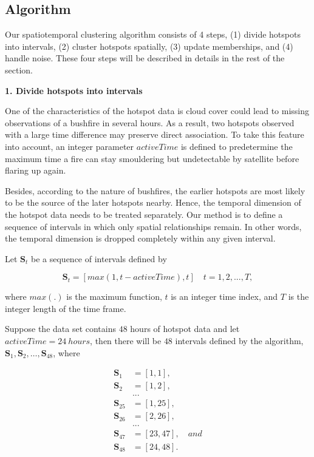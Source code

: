 \hypertarget{algorithm}{%
\subsection{Algorithm}\label{algorithm}}

Our spatiotemporal clustering algorithm consists of 4 steps, (1) divide
hotspots into intervals, (2) cluster hotspots spatially, (3) update
memberships, and (4) handle noise. These four steps will be described in
details in the rest of the section.

\textbf{1. Divide hotspots into intervals}

One of the characteristics of the hotspot data is cloud cover could lead
to missing observations of a bushfire in several hours. As a result, two
hotspots observed with a large time difference may preserve direct
association. To take this feature into account, an integer parameter
\(activeTime\) is defined to predetermine the maximum time a fire can
stay smouldering but undetectable by satellite before flaring up again.

Besides, according to the nature of bushfires, the earlier hotspots are
most likely to be the source of the later hotspots nearby. Hence, the
temporal dimension of the hotspot data needs to be treated separately.
Our method is to define a sequence of intervals in which only spatial
relationships remain. In other words, the temporal dimension is dropped
completely within any given interval.

Let \(\boldsymbol{S}_t\) be a sequence of intervals defined by

\[\boldsymbol{S}_t = [max(1,t-activeTime),t]\quad t = 1,2,...,T,\]

where \(max(.)\) is the maximum function, \(t\) is an integer time
index, and \(T\) is the integer length of the time frame.

Suppose the data set contains \(48\) hours of hotspot data and let
\(activeTime = 24~hours\), then there will be \(48\) intervals defined
by the algorithm,
\(\boldsymbol{S}_1,\boldsymbol{S}_2,\ldots,\boldsymbol{S}_{48}\), where

\begin{align*}
\boldsymbol{S}_1 &= [1,1],\\
\boldsymbol{S}_2 &= [1,2],\\
&...\\
\boldsymbol{S}_{25} &= [1,25],\\
\boldsymbol{S}_{26} &= [2,26],\\
&...\\
\boldsymbol{S}_{47} &= [23,47], \quad and\\
\boldsymbol{S}_{48} &= [24,48].
\end{align*}

